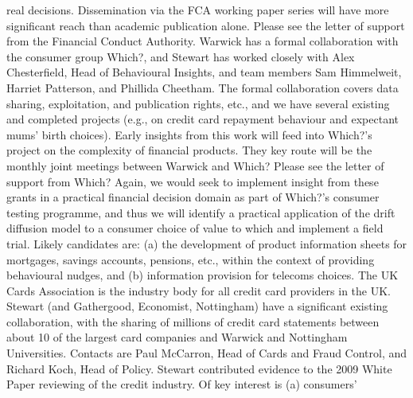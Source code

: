 \documentclass[11pt, a4paper]{article}
\begin{document}
real decisions. Dissemination via the FCA working paper series will have more significant
reach than academic publication alone. Please see the letter of support from the Financial
Conduct Authority.
Warwick has a formal collaboration with the consumer group Which?, and Stewart has
worked closely with Alex Chesterfield, Head of Behavioural Insights, and team members
Sam Himmelweit, Harriet Patterson, and Phillida Cheetham. The formal collaboration covers
data sharing, exploitation, and publication rights, etc., and we have several existing and
completed projects (e.g., on credit card repayment behaviour and expectant mums’ birth
choices). Early insights from this work will feed into Which?’s project on the complexity of
financial products. They key route will be the monthly joint meetings between Warwick and
Which? Please see the letter of support from Which? Again, we would seek to implement
insight from these grants in a practical financial decision domain as part of Which?’s
consumer testing programme, and thus we will identify a practical application of the drift
diffusion model to a consumer choice of value to which and implement a field trial. Likely
candidates are: (a) the development of product information sheets for mortgages, savings
accounts, pensions, etc., within the context of providing behavioural nudges, and (b)
information provision for telecoms choices.
The UK Cards Association is the industry body for all credit card providers in the UK.
Stewart (and Gathergood, Economist, Nottingham) have a significant existing collaboration,
with the sharing of millions of credit card statements between about 10 of the largest card
companies and Warwick and Nottingham Universities. Contacts are Paul McCarron, Head of
Cards and Fraud Control, and Richard Koch, Head of Policy. Stewart contributed evidence to
the 2009 White Paper reviewing of the credit industry. Of key interest is (a) consumers’
\end{document}
